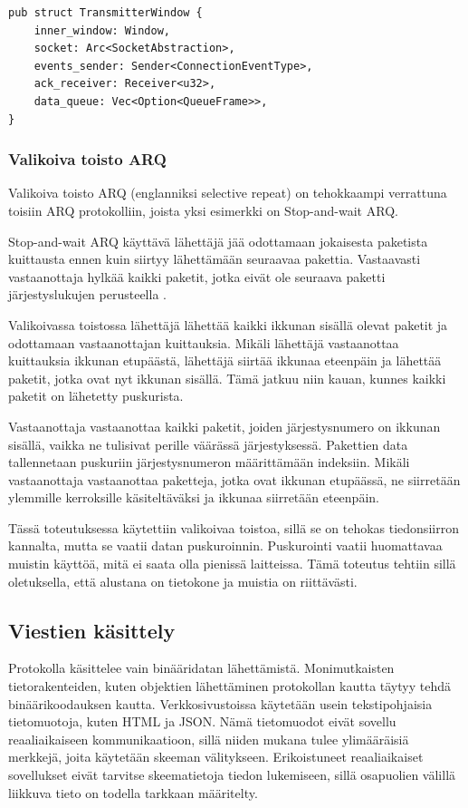 \documentclass[a4paper,12pt]{article}
\begin{document}
    \begin{lstlisting}[caption={Lähettävän ikkunan rakenne}, label={lst:twindow}]
pub struct TransmitterWindow {
    inner_window: Window,
    socket: Arc<SocketAbstraction>,
    events_sender: Sender<ConnectionEventType>,
    ack_receiver: Receiver<u32>,
    data_queue: Vec<Option<QueueFrame>>,
}\end{lstlisting}

    \subsubsection*{Valikoiva toisto ARQ}\label{subsec:valikoiva_toisto}
    Valikoiva toisto ARQ (englanniksi selective repeat) on tehokkaampi verrattuna toisiin ARQ protokolliin, joista yksi esimerkki on Stop-and-wait ARQ.

    Stop-and-wait ARQ käyttävä lähettäjä jää odottamaan jokaisesta paketista kuittausta ennen kuin siirtyy lähettämään seuraavaa pakettia. Vastaavasti vastaanottaja hylkää kaikki paketit, jotka eivät ole seuraava paketti järjestyslukujen perusteella \cite{StopAndWaitARQ}.

    Valikoivassa toistossa lähettäjä lähettää kaikki ikkunan sisällä olevat paketit ja odottamaan vastaanottajan kuittauksia. Mikäli lähettäjä vastaanottaa kuittauksia ikkunan etupäästä, lähettäjä siirtää ikkunaa eteenpäin ja lähettää paketit, jotka ovat nyt ikkunan sisällä. Tämä jatkuu niin kauan, kunnes kaikki paketit on lähetetty puskurista. \par

    Vastaanottaja vastaanottaa kaikki paketit, joiden järjestysnumero on ikkunan sisällä, vaikka ne tulisivat perille väärässä järjestyksessä. Pakettien data tallennetaan puskuriin järjestysnumeron määrittämään indeksiin. Mikäli vastaanottaja vastaanottaa paketteja, jotka ovat ikkunan etupäässä, ne siirretään ylemmille kerroksille käsiteltäväksi ja ikkunaa siirretään eteenpäin.

    Tässä toteutuksessa käytettiin valikoivaa toistoa, sillä se on tehokas tiedonsiirron kannalta, mutta se vaatii datan puskuroinnin. Puskurointi vaatii huomattavaa muistin käyttöä, mitä ei saata olla pienissä laitteissa. Tämä toteutus tehtiin sillä oletuksella, että alustana on tietokone ja muistia on riittävästi.\par

    \subsection{Viestien käsittely}
    Protokolla käsittelee vain binääridatan lähettämistä. Monimutkaisten tietorakenteiden, kuten objektien lähettäminen protokollan kautta täytyy tehdä binäärikoodauksen kautta. Verkkosivustoissa käytetään usein tekstipohjaisia tietomuotoja, kuten HTML ja JSON. Nämä tietomuodot eivät sovellu reaaliaikaiseen kommunikaatioon, sillä niiden mukana tulee ylimääräisiä merkkejä, joita käytetään skeeman välitykseen. Erikoistuneet reaaliaikaiset sovellukset eivät tarvitse skeematietoja tiedon lukemiseen, sillä osapuolien välillä liikkuva tieto on todella tarkkaan määritelty.
    \par
\end{document}

